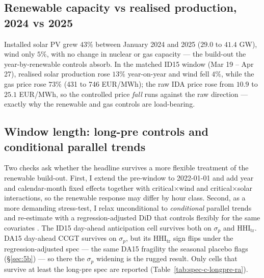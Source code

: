 \documentclass[11pt,a4paper]{article}
\theoremstyle{definition}
\theoremstyle{remark}
\theoremstyle{plain}
\begin{document}
\subsection{Renewable capacity vs realised production, 2024 vs 2025}\label{app:renewables-check}

Installed solar PV grew $43\%$ between January 2024 and 2025 ($29.0$ to $41.4$ GW), wind only $5\%$, with no change in nuclear or gas capacity --- the build-out the year-by-renewable controls absorb. In the matched ID15 window (Mar 19 -- Apr 27), realised solar production rose $13\%$ year-on-year and wind fell $4\%$, while the gas price rose $73\%$ (431 to 746 EUR/MWh); the raw IDA price rose from $10.9$ to $25.1$ EUR/MWh, so the controlled price \emph{fall} runs against the raw direction --- exactly why the renewable and gas controls are load-bearing.

\subsection{Window length: long-pre controls and conditional parallel trends}\label{sec:5-long-pre-ra}

Two checks ask whether the headline survives a more flexible treatment of the renewable build-out. First, I extend the pre-window to 2022-01-01 and add year and calendar-month fixed effects together with critical$\times$wind and critical$\times$solar interactions, so the renewable response may differ by hour class. Second, as a more demanding stress-test, I relax unconditional to \emph{conditional} parallel trends and re-estimate with a regression-adjusted DiD that controls flexibly for the same covariates \citep{heckman1997}. The ID15 day-ahead anticipation cell survives both on $\sigma_p$ and $\text{HHI}_{\text{tr}}$. DA15 day-ahead CCGT survives on $\sigma_p$, but its $\text{HHI}_{\text{tr}}$ sign flips under the regression-adjusted spec --- the same DA15 fragility the seasonal placebo flags (\S\ref{sec:5b}) --- so there the $\sigma_p$ widening is the rugged result. Only cells that survive at least the long-pre spec are reported (Table~\ref{tab:spec-c-longpre-ra}).
\end{document}
